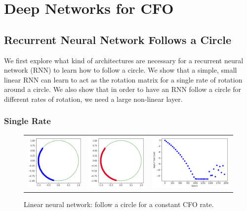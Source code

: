 \chapter{Deep Networks for CFO}

\section{Recurrent Neural Network Follows a Circle}

We first explore what kind of architectures are necessary for a recurrent neural network (RNN) to learn how to follow a circle.
We show that a simple, small linear RNN can learn to act as the rotation matrix for a single rate of rotation around a circle.
We also show that in order to have an RNN follow a circle for different rates of rotation, we need a large non-linear layer.

\subsection{Single Rate}

\setlength{\tabcolsep}{0pt}
\begin{figure}
  \centering
  \caption{Linear neural network: follow a circle for a constant CFO rate.}
  \begin{tabular}{ccc}
    \includegraphics[width=50mm]{figures/cfo/follow_circle_linear_before.png}&
    \includegraphics[width=50mm]{figures/cfo/follow_circle_linear_after.png}&
    \includegraphics[width=70mm]{figures/cfo/follow_circle_linear_loss.png}\\
  \end{tabular}
  \label{fig:circle_constant_rate}
\end{figure}

